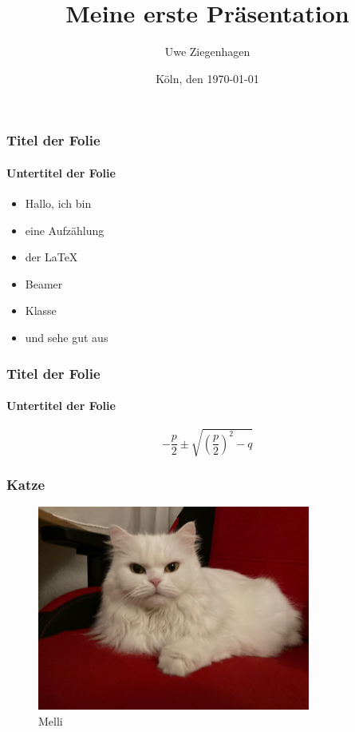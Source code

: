 \documentclass[12pt,ngerman]{beamer}
\title{Meine erste Präsentation}
\author{Uwe Ziegenhagen}
\institute{DLR}
\date{Köln, den \today}
\begin{document}
\begin{frame}

\maketitle

\end{frame}


\begin{frame}
\frametitle{Titel der Folie}
\framesubtitle{Untertitel der Folie}

\begin{itemize}
\item Hallo, ich bin
\item eine Aufzählung
\item der LaTeX
\item Beamer 
\item Klasse
\item und sehe gut aus
\end{itemize}

\end{frame}

\begin{frame}
\frametitle{Titel der Folie}
\framesubtitle{Untertitel der Folie}

\begin{equation}
- \frac{p}{2} \pm \sqrt{\left(\frac{p}{2}\right)^2 - q}
\end{equation}

\end{frame}

\begin{frame}
\frametitle{Katze}

\begin{figure}
\begin{center}
\includegraphics[width=0.8\textwidth]{Bilder/Katze}
\caption{Melli}
\end{center}
\end{figure}

\end{frame}
\end{document}
